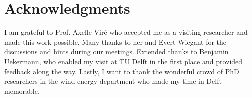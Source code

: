 \documentclass{layout/tudelft-aiaa}
\begin{document}




\section*{Acknowledgments}

I am grateful to Prof. Axelle Viré who accepted me as a visiting researcher and made this work possible. Many thanks to her and Evert Wiegant for the discussions and hints during our meetings. Extended thanks to Benjamin Uekermann, who enabled my visit at TU Delft in the first place and provided feedback along the way. Lastly, I want to thank the wonderful crowd of PhD researchers in the wind energy department who made my time in Delft memorable.


\printbibliography

\begin{comment}
\section*{Appendix}

Possible points to include in the Appendix
\begin{itemize}
\item Files from the OpenFOAM adapter with hints on how to modify them
\item Files from AspFAST with hints on how to reuse the code for our mapping
\end{itemize}
\end{comment}
\end{document}
